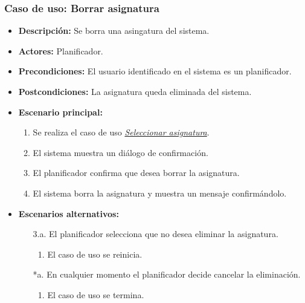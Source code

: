\subsubsection*{Caso de uso: Borrar asignatura}
\begin{itemize}
\item{\bf Descripción:} Se borra una asingatura del sistema.
\item{\bf Actores:} Planificador.
\item{\bf Precondiciones:} El usuario identificado en el sistema es un planificador.
\item{\bf Postcondiciones:} La asignatura queda eliminada del sistema.
\item{\bf Escenario principal:}
	\begin{enumerate}
	\item Se realiza el caso de uso {\em \hyperref[select_asignatura]{Seleccionar asignatura}}.
	\item El sistema muestra un diálogo de confirmación.
	\item El planificador confirma que desea borrar la asignatura.
	\item El sistema borra la asignatura y muestra un mensaje confirmándolo.
	\end{enumerate}
\item{\bf Escenarios alternativos:}
	\begin{itemize}
	\item[3.a.] El planificador selecciona que no desea eliminar la asignatura.
		\begin{enumerate}
		\item El caso de uso se reinicia.
		\end{enumerate}
	\item[*a.] En cualquier momento el planificador decide cancelar la eliminación.
		\begin{enumerate}
		\item El caso de uso se termina.
		\end{enumerate}
	\end{itemize}
\end{itemize}



